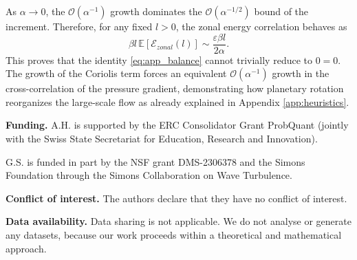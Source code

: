 \documentclass[11pt,a4paper]{article}
\numberwithin{equation}{section}
\numberwithin{theorem}{section}
\numberwithin{remark}{section}
\numberwithin{definition}{section}
\begin{document}
As $\alpha \to 0$, the $\mathcal{O}(\alpha^{-1})$ growth dominates the $\mathcal{O}(\alpha^{-1/2})$ bound of the increment. Therefore, for any fixed $l > 0$, the zonal energy correlation behaves as
\begin{equation}
    \beta l \, \mathbb{E}[\mathcal{E}_{zonal}(l)] \sim \frac{\varepsilon \beta l}{2\alpha}.
\end{equation}
This proves that the identity \eqref{eq:app_balance} cannot trivially reduce to $0=0$. The growth of the Coriolis term forces an equivalent $\mathcal{O}(\alpha^{-1})$ growth in the cross-correlation of the pressure gradient, demonstrating how planetary rotation reorganizes the large-scale flow as already explained in Appendix \ref{app:heuristics}.



\vspace{8mm}

\textbf{Funding.}  A.H. is supported by the ERC Consolidator Grant ProbQuant (jointly with the Swiss State
Secretariat for Education, Research and Innovation).

G.S. is funded in part by the NSF grant DMS-2306378 and the Simons Foundation through the Simons Collaboration on Wave Turbulence.

\textbf{Conflict of interest.} The authors declare that they have no conflict of interest.

\textbf{Data availability.} Data sharing is not applicable.
We do not analyse or generate any datasets, because our work proceeds within a theoretical and mathematical approach.




  
\end{document}
